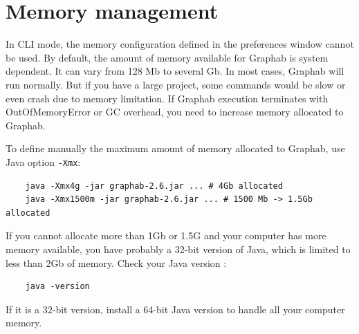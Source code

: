 \documentclass[a4paper,10pt]{report}
\begin{document}
\section{Memory management}
In CLI mode, the memory configuration defined in the preferences window cannot be used.
By default, the amount of memory available for Graphab is system dependent. It can vary from 128 Mb to several Gb.
In most cases, Graphab will run normally. But if you have a large project, some commands would be slow or even crash due to memory limitation.
If Graphab execution terminates with OutOfMemoryError or GC overhead, you need to increase memory allocated to Graphab.

To define manually the maximum amount of memory allocated to Graphab, use Java option \verb|-Xmx|:
\begin{Verbatim}
	java -Xmx4g -jar graphab-2.6.jar ... # 4Gb allocated
	java -Xmx1500m -jar graphab-2.6.jar ... # 1500 Mb -> 1.5Gb allocated
\end{Verbatim}
If you cannot allocate more than 1Gb or 1.5G and your computer has more memory available, you have probably a
 32-bit version of Java, which is limited to less than 2Gb of memory.
Check your Java version :
\begin{Verbatim}
	java -version
\end{Verbatim}
If it is a 32-bit version, install a 64-bit Java version to handle all your computer memory.



\end{document}
